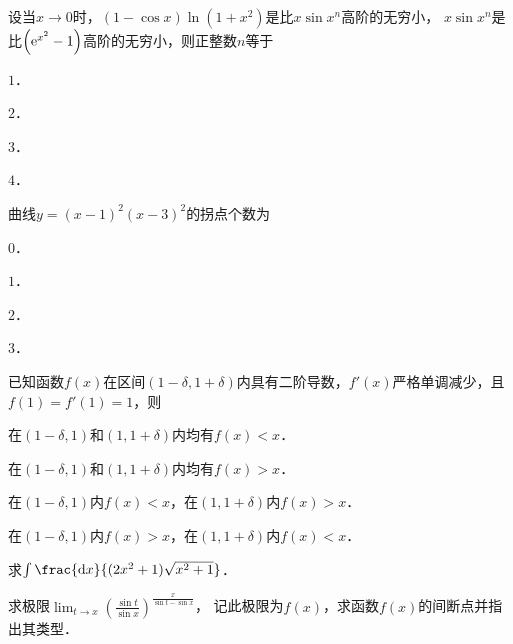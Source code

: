 \documentclass[plain,noanswer,medmath]{../../template/jnuexam}
\begin{document}
\begin{problem}
设当$x \to 0$时，$(1 - \cos x)\ln(1 + x^2)$是比$x\sin x^n$高阶的无穷小，
$x\sin x^n$是比$\left(\mathrm{e}^{x^2} - 1 \right)$高阶的无穷小，则正整数$n$等于\pickout{}
\begin{abcd}
\item $1$．
\item $2$．
\item $3$．
\item $4$．
\end{abcd}
\end{problem}


\begin{problem}
曲线$y = (x - 1)^2(x - 3)^2$的拐点个数为\pickout{}
\begin{abcd}
\item $0$．
\item $1$．
\item $2$．
\item $3$．
\end{abcd}
\end{problem}


\begin{problem}
已知函数$f(x)$在区间$(1 - \delta ,1 + \delta)$内具有二阶导数，$f'(x)$严格单调减少，且$f(1) = f'(1) = 1$，则\pickout{}
\begin{abcd}
\item 在$(1 - \delta ,1)$和$(1,1 + \delta)$内均有$f(x) < x$．
\item 在$(1 - \delta ,1)$和$(1,1 + \delta)$内均有$f(x) > x$．
\item 在$(1 - \delta ,1)$内$f(x) < x$，在$(1,1 + \delta)$内$f(x) > x$．
\item 在$(1 - \delta ,1)$内$f(x) > x$，在$(1,1 + \delta)$内$f(x) < x$．
\end{abcd}
\end{problem}





\begin{problem}
求$\int \frac{\dx}{(2x^2 + 1)\sqrt{x^2 + 1}}$．
\end{problem}



\begin{problem}
求极限$\lim_{t \to x} \left(\frac{\sin t}{\sin x} \right)^{\frac{x}{\sin t - \sin x}}$，
记此极限为$f(x)$，求函数$f(x)$的间断点并指出其类型．
\end{problem}
\end{document}
